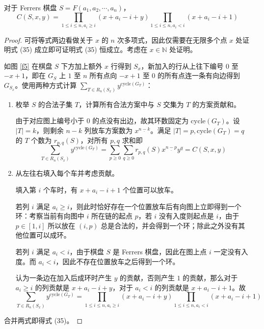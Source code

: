 \documentclass{noithesis}
\begin{document}
	\begin{theorem}\label{increasecoverfac}
		对于 Ferrers 棋盘 $S = F(a_1,a_2,\cdots,a_n)$，
		\begin{equation}
		C(S,x,y) = \prod_{1 \leq i \leq n, a_i \geq i}(x+a_i-i+y)\prod_{1 \leq i \leq n,a_i < i}(x+a_i-i+1)
		\end{equation}
	\end{theorem}
	\begin{proof}
		可将等式两边看做关于 $x$ 的 $n$ 次多项式，因此仅需要在无限多个点 $x$ 处证明式 (35) 成立即可证明式 (35) 恒成立。考虑在 $x \in \mathbb{N}$ 处证明。
		
		如图 \ref{f5} 在棋盘 $S$ 下方加上额外 $x$ 行得到 $S_x$，新加入的行从上往下编号 $0$ 至 $-x+1$，即在 $G_S$ 上 $1$ 至 $n$ 所有点向 $-x+1$ 至 $0$ 的所有点连一条有向边得到 $G_{S_x}$。使用两种方式计算 $\sum_{T \in R_n(S_x)}y^{\mathrm{cycle}(G_T)}$：
		\begin{enumerate}
			\item 枚举 $S$ 的合法子集 $T$，计算所有合法方案中与 $S$ 交集为 $T$ 的方案贡献和。
			
			由于对应图上编号小于 $0$ 的点没有出边，故其环数固定为 $\mathrm{cycle}(G_T)$。设 $|T| = k$，则剩余 $n-k$ 列放车方案数为 $x^{\underline {n-k}}$。满足 $|T| = p,\mathrm{cycle}(G_T) = q$ 的 $T$ 个数为 $r_{p,q}(S)$，对所有 $p,q$ 求和即 $$\sum_{T \in R_n(S_x)}y^{\mathrm{cycle}(G_T)} = 
			\sum_{p \geq 0}\sum_{q \geq 0} r_{p,q}(S)x^{\underline{n-p}}y^q = C(S,x,y) $$
			\item 从左往右填入每个车并考虑贡献。
			
			填入第 $i$ 个车时，有 $x+a_i-i+1$ 个位置可以放车。
			
			若列 $i$ 满足 $a_i \geq i$，则此时恰好存在一个位置放车后有向图上立即得到一个环：考察当前有向图中 $i$ 所在链的起点 $p$，若 $i$ 没有入度则起点是 $i$，由于 $p \in [1,i]$ 所以放在 $(i,p)$ 总是合法的，并会得到一个环；除此之外没有其他位置可以成环。
			
			若列 $i$ 满足 $a_i < i$，由于棋盘 $S$ 是 Ferrers 棋盘，因此在图上点 $i$ 一定没有入度。而 $a_i<i$，因此不存在位置放车之后得到一个环。
			
			认为一条边在加入后成环时产生 $y$ 的贡献，否则产生 $1$ 的贡献，那么对于 $a_i \geq i$ 的列贡献是 $x+a_i-i+y$，对于 $a_i < i$ 的列贡献是 $x+a_i-i+1$。故 $$\sum_{T \in R_n(S_x)}y^{\mathrm{cycle}(G_T)} = \prod_{1 \leq i \leq n, a_i \geq i}(x+a_i-i+y)\prod_{1 \leq i \leq n,a_i < i}(x+a_i-i+1)$$
		\end{enumerate}
		合并两式即得式 (35)。
	\end{proof}
	
\end{document}
